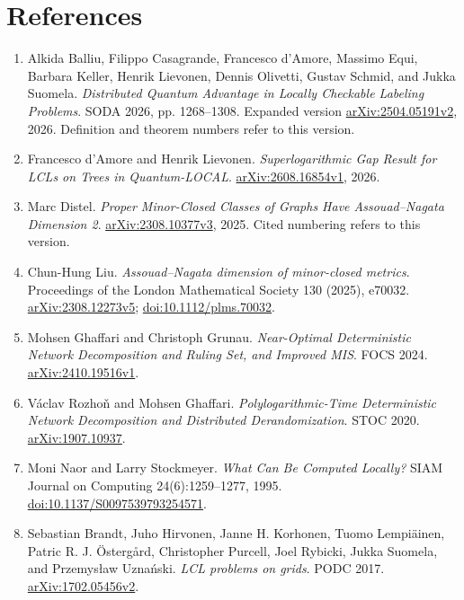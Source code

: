 \documentclass[11pt,a4paper]{article}
\begin{document}
\section{References}
\begin{enumerate}
\item Alkida Balliu, Filippo Casagrande, Francesco d'Amore, Massimo Equi, Barbara Keller, Henrik Lievonen, Dennis Olivetti, Gustav Schmid, and Jukka Suomela.
\emph{Distributed Quantum Advantage in Locally Checkable Labeling Problems}.
SODA 2026, pp. 1268--1308.
Expanded version \href{https://arxiv.org/abs/2504.05191v2}{arXiv:2504.05191v2}, 2026.
Definition and theorem numbers refer to this version.
\item Francesco d'Amore and Henrik Lievonen.
\emph{Superlogarithmic Gap Result for LCLs on Trees in Quantum-LOCAL}.
\href{https://arxiv.org/abs/2608.16854v1}{arXiv:2608.16854v1}, 2026.
\item Marc Distel.
\emph{Proper Minor-Closed Classes of Graphs Have Assouad--Nagata Dimension 2}.
\href{https://arxiv.org/abs/2308.10377v3}{arXiv:2308.10377v3}, 2025.
Cited numbering refers to this version.
\item Chun-Hung Liu.
\emph{Assouad--Nagata dimension of minor-closed metrics}.
Proceedings of the London Mathematical Society 130 (2025), e70032.
\href{https://arxiv.org/abs/2308.12273v5}{arXiv:2308.12273v5}; \href{https://doi.org/10.1112/plms.70032}{doi:10.1112/plms.70032}.
\item Mohsen Ghaffari and Christoph Grunau.
\emph{Near-Optimal Deterministic Network Decomposition and Ruling Set, and Improved MIS}.
FOCS 2024.
\href{https://arxiv.org/abs/2410.19516v1}{arXiv:2410.19516v1}.
\item V\'aclav Rozho\v{n} and Mohsen Ghaffari.
\emph{Polylogarithmic-Time Deterministic Network Decomposition and Distributed Derandomization}.
STOC 2020.
\href{https://arxiv.org/abs/1907.10937}{arXiv:1907.10937}.
\item Moni Naor and Larry Stockmeyer.
\emph{What Can Be Computed Locally?} SIAM Journal on Computing 24(6):1259--1277, 1995.
\href{https://doi.org/10.1137/S0097539793254571}{doi:10.1137/S0097539793254571}.
\item Sebastian Brandt, Juho Hirvonen, Janne H. Korhonen, Tuomo Lempi\"ainen, Patric R. J. \"Osterg\aa rd, Christopher Purcell, Joel Rybicki, Jukka Suomela, and Przemys\l aw Uzna\'nski.
\emph{LCL problems on grids}.
PODC 2017.
\href{https://arxiv.org/abs/1702.05456v2}{arXiv:1702.05456v2}.
\end{enumerate}
\end{document}
